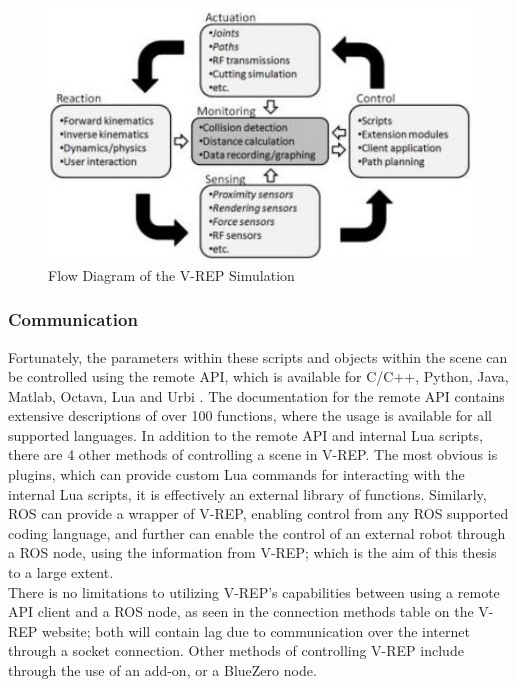 \documentclass[12pt,openany,a4paper]{book}
\begin{document}
\begin{center}
\begin{figure}[htb]
  \includegraphics[width=\linewidth]{vrep_simulation_diagram.jpg}
\caption{Flow Diagram of the V-REP Simulation}
\end{figure}
\end{center}

\subsubsection{Communication}
Fortunately, the parameters within these scripts and objects within the scene can be controlled using the remote API, which is available for C/C++, Python, Java, Matlab, Octava, Lua and Urbi \cite{CodeVREP}. The documentation for the remote API contains extensive descriptions of over 100 functions, where the usage is available for all supported languages. In addition to the remote API and internal Lua scripts, there are 4 other methods of controlling a scene in V-REP. The most obvious is plugins, which can provide custom Lua commands for interacting with the internal Lua scripts, it is effectively an external library of functions. Similarly, ROS can provide a wrapper of V-REP, enabling control from any ROS supported coding language, and further can enable the control of an external robot through a ROS node, using the information from V-REP; which is the aim of this thesis to a large extent.\\
There is no limitations to utilizing V-REP's capabilities between using a remote API client and a ROS node, as seen in the connection methods table on the V-REP website; both will contain lag due to communication over the internet through a socket connection. Other methods of controlling V-REP include through the use of an add-on, or a BlueZero node.
\end{document}
